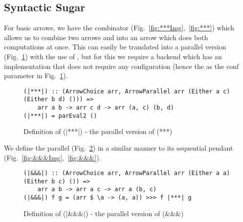 \subsection{Syntactic Sugar} \label{syntacticSugar}
For basic arrows, we have the \code{(***)} combinator (Fig.~\ref{fig:***Img},~\ref{fig:***}) which allows us to combine two arrows  and  into an arrow  which does both computations at once. This can easily be translated into a parallel version \code{(|***|)} (Fig.~\ref{fig:|***|}) with the use of , but for this we require a backend which has an implementation that does not require any configuration (hence the \code{()} as the conf parameter in Fig.~\ref{fig:|***|}).
\begin{figure}[h]
\begin{lstlisting}[frame=htrbl]
(|***|) :: (ArrowChoice arr, ArrowParallel arr (Either a c) (Either b d) ())) =>
	arr a b -> arr c d -> arr (a, c) (b, d)
(|***|) = parEval2 ()
\end{lstlisting}
\caption{Definition of (|***|) - the parallel version of (***)}
\label{fig:|***|}
\end{figure}
We define the parallel \code{(|\&\&\&|)} (Fig.~\ref{fig:|&&&|}) in a similar manner to its sequential pendant \code{(\&\&\&)} (Fig.~\ref{fig:&&&Img},~\ref{fig:&&&}).
\begin{figure}[h]
\begin{lstlisting}[frame=htrbl]
(|&&&|) :: (ArrowChoice arr, ArrowParallel arr (Either a a) (Either b c) ()) =>
	arr a b -> arr a c -> arr a (b, c)
(|&&&|) f g = (arr $ \a -> (a, a)) >>> f |***| g
\end{lstlisting} %
\caption{Definition of (|\&\&\&|) - the parallel version of (\&\&\&)}
\label{fig:|&&&|}
\end{figure}